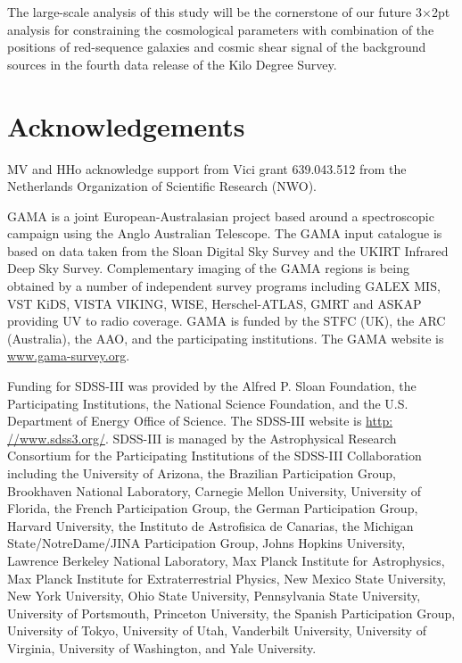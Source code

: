 \documentclass{aa}
\numberwithin{equation}{section}
\begin{document}
{The large-scale analysis of this study will be the cornerstone of our future 3$\times$2pt analysis for constraining the cosmological parameters with combination of the positions of red-sequence galaxies and cosmic shear signal of the background sources in the fourth data release of the Kilo Degree Survey. 


\section*{Acknowledgements}

MV and HHo acknowledge
support from Vici grant 639.043.512 from the Netherlands
Organization of Scientific Research (NWO).

GAMA is a joint European-Australasian project based
around a spectroscopic campaign using the Anglo Australian
Telescope. The GAMA input catalogue is based on data
taken from the Sloan Digital Sky Survey and the UKIRT
Infrared Deep Sky Survey. Complementary imaging of the
GAMA regions is being obtained by a number of independent survey programs including GALEX MIS, VST
KiDS, VISTA VIKING, WISE, Herschel-ATLAS, GMRT
and ASKAP providing UV to radio coverage. GAMA is
funded by the STFC (UK), the ARC (Australia), the AAO,
and the participating institutions. The GAMA website is
\hyperlink{www.gama-survey.org}{www.gama-survey.org}.

Funding for SDSS-III was provided by the Alfred P.
Sloan Foundation, the Participating Institutions, the National Science Foundation, and the U.S. Department of
Energy Office of Science. The SDSS-III website is \hyperlink{http:
//www.sdss3.org/}{http:
//www.sdss3.org/}. SDSS-III is managed by the Astrophysical Research Consortium for the Participating Institutions
of the SDSS-III Collaboration including the University of
Arizona, the Brazilian Participation Group, Brookhaven
National Laboratory, Carnegie Mellon University, University of Florida, the French Participation Group, the German Participation Group, Harvard University, the Instituto de Astrofisica de Canarias, the Michigan State/NotreDame/JINA Participation Group, Johns Hopkins University, Lawrence Berkeley National Laboratory, Max Planck
Institute for Astrophysics, Max Planck Institute for Extraterrestrial Physics, New Mexico State University, New
York University, Ohio State University, Pennsylvania State
University, University of Portsmouth, Princeton University,
the Spanish Participation Group, University of Tokyo, University of Utah, Vanderbilt University, University of Virginia, University of Washington, and Yale University.

}
\end{document}
